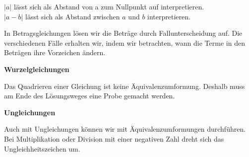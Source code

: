 \documentclass[a4paper]{article}
\begin{document}
$\vert a \vert$ lässt sich als Abstand von a zum Nullpunkt auf interpretieren. \\
$\vert a - b \vert$ lässt sich als Abstand zwischen $a$ und $b$ interpretieren.
\bigskip

In Betragsgleichungen lösen wir die Beträge durch Fallunterscheidung auf. Die verschiedenen Fälle erhalten wir, indem
wir betrachten, wann die Terme in den Beträgen ihre Vorzeichen ändern.
\bigskip


\textbf{Wurzelgleichungen}
\bigskip

Das Quadrieren einer Gleichung ist keine Äquivalenzumformung. Deshalb muss am Ende des Lösungsweges eine Probe gemacht werden.
\bigskip
 
\textbf{Ungleichungen}
\bigskip

Auch mit Ungleichungen können wir mit Äquivalenzumformungen durchführen. 
Bei Multiplikation oder Division mit einer negativen Zahl dreht sich das Ungleichheitszeichen um.
\bigskip
\end{document}
